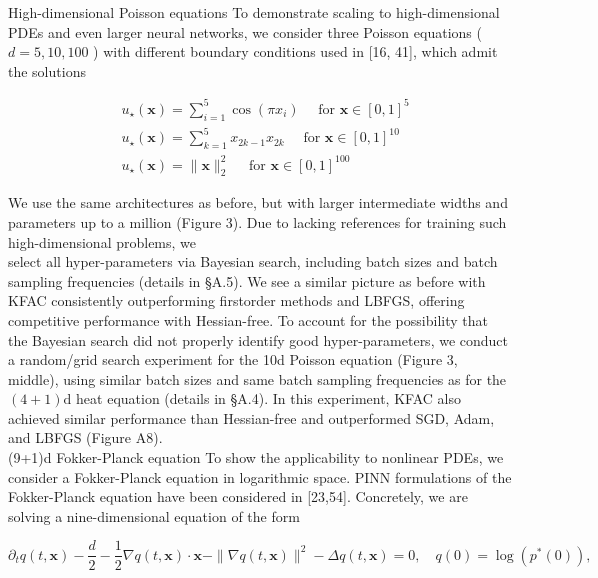 \documentclass[10pt]{article}
\begin{document}
High-dimensional Poisson equations To demonstrate scaling to high-dimensional PDEs and even larger neural networks, we consider three Poisson equations ( $d=5,10,100$ ) with different boundary conditions used in [16, 41], which admit the solutions


\begin{align*}
& u_{\star}(\boldsymbol{x})=\sum_{i=1}^{5} \cos \left(\pi x_{i}\right) \quad \text { for } \boldsymbol{x} \in[0,1]^{5} \\
& u_{\star}(\boldsymbol{x})=\sum_{k=1}^{5} x_{2 k-1} x_{2 k} \quad \text { for } \boldsymbol{x} \in[0,1]^{10}  \tag{18}\\
& u_{\star}(\boldsymbol{x})=\|\boldsymbol{x}\|_{2}^{2} \quad \text { for } \boldsymbol{x} \in[0,1]^{100}
\end{align*}


We use the same architectures as before, but with larger intermediate widths and parameters up to a million (Figure 3). Due to lacking references for training such high-dimensional problems, we\\
select all hyper-parameters via Bayesian search, including batch sizes and batch sampling frequencies (details in §A.5). We see a similar picture as before with KFAC consistently outperforming firstorder methods and LBFGS, offering competitive performance with Hessian-free. To account for the possibility that the Bayesian search did not properly identify good hyper-parameters, we conduct a random/grid search experiment for the 10d Poisson equation (Figure 3, middle), using similar batch sizes and same batch sampling frequencies as for the $(4+1) \mathrm{d}$ heat equation (details in §A.4). In this experiment, KFAC also achieved similar performance than Hessian-free and outperformed SGD, Adam, and LBFGS (Figure A8).\\[0pt]
(9+1)d Fokker-Planck equation To show the applicability to nonlinear PDEs, we consider a Fokker-Planck equation in logarithmic space. PINN formulations of the Fokker-Planck equation have been considered in [23,54]. Concretely, we are solving a nine-dimensional equation of the form


\begin{equation*}
\partial_{t} q(t, \boldsymbol{x})-\frac{d}{2}-\frac{1}{2} \nabla q(t, \boldsymbol{x}) \cdot \boldsymbol{x}-\|\nabla q(t, \boldsymbol{x})\|^{2}-\Delta q(t, \boldsymbol{x})=0, \quad q(0)=\log \left(p^{*}(0)\right), \tag{19}
\end{equation*}
\end{document}
